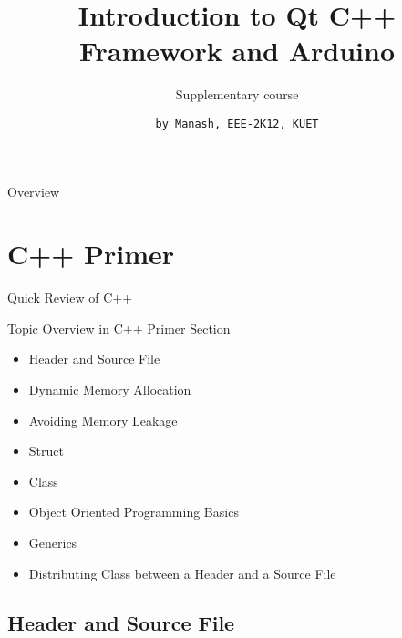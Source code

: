 \documentclass[newPxFont]{beamer}
\title{Introduction to Qt C++ Framework and Arduino}
\subtitle{Supplementary course}
\date{}
\author{\texttt{by Manash, EEE-2K12, KUET}}
\institute{\textit{Khulna University of Engineering \& Technology}}
\begin{document}
%
%

\maketitle


\begin{frame}{Overview}
    \tableofcontents
\end{frame}



%
%

\section{C++ Primer}


\begin{frame}[allowframebreaks]{Quick Review of C++}


\begin{block}{Topic Overview in C++ Primer Section}
	\begin{itemize}
	    \item Header and Source File
		\item Dynamic Memory Allocation 
		\item Avoiding Memory Leakage
		\item Struct
		\item Class
		\item Object Oriented Programming Basics
		\item Generics
		\item Distributing Class between a Header and a Source File
	\end{itemize}
\end{block}

\end{frame}


\subsection{Header and Source File}
\end{document}
